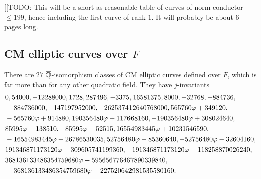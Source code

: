 \documentclass{amsart}
\begin{document}
[[TODO: This will be a short-as-reasonable table of curves of norm
conductor $\leq 199$, hence including the first curve of rank $1$.  It
will probably be about 6 pages long.]]

\subsection{CM elliptic curves over $F$}\label{sec:cm}

There are $27$ $\overline{\mathbb{Q}}$-isomorphism classes of CM elliptic curves
defined over $F$, which is far more than for any other quadratic
field. They have $j$-invariants
\begin{align*}
 & 0, 54000, -12288000, 1728, 287496, -3375, 16581375, 8000, -32768, -884736,\\
&  -884736000, -147197952000, -262537412640768000, 565760 \varphi + 349120,\\
& -565760 \varphi + 914880, 190356480 \varphi + 117668160,  -190356480 \varphi + 308024640,\\
& 85995 \varphi - 138510, -85995 \varphi - 52515, 16554983445 \varphi + 10231546590,\\
&  -16554983445 \varphi + 26786530035, 52756480 \varphi - 85360640,  -52756480 \varphi - 32604160, \\
& 191346871173120 \varphi -
309605741199360, -191346871173120 \varphi - 118258870026240,\\
& 368136133486354759680 \varphi - 595656776467890339840,\\
&-368136133486354759680 \varphi - 227520642981535580160.
\end{align*}
\end{document}
